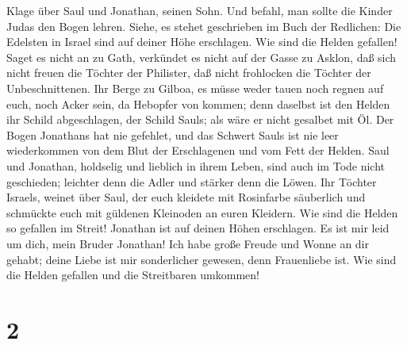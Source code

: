Klage über Saul und Jonathan, seinen Sohn.  Und befahl, man
sollte die Kinder Judas den Bogen lehren. Siehe, es stehet geschrieben
im Buch der Redlichen:  Die Edelsten in Israel sind auf
deiner Höhe erschlagen. Wie sind die Helden gefallen! 
Saget es nicht an zu Gath, verkündet es nicht auf der Gasse zu Asklon,
daß sich nicht freuen die Töchter der Philister, daß nicht frohlocken
die Töchter der Unbeschnittenen.  Ihr Berge zu Gilboa, es
müsse weder tauen noch regnen auf euch, noch Acker sein, da Hebopfer von
kommen; denn daselbst ist den Helden ihr Schild abgeschlagen, der Schild
Sauls; als wäre er nicht gesalbet mit Öl.  Der Bogen
Jonathans hat nie gefehlet, und das Schwert Sauls ist nie leer
wiederkommen von dem Blut der Erschlagenen und vom Fett der Helden.
 Saul und Jonathan, holdselig und lieblich in ihrem Leben,
sind auch im Tode nicht geschieden; leichter denn die Adler und stärker
denn die Löwen.  Ihr Töchter Israels, weinet über Saul, der
euch kleidete mit Rosinfarbe säuberlich und schmückte euch mit güldenen
Kleinoden an euren Kleidern.  Wie sind die Helden so
gefallen im Streit! Jonathan ist auf deinen Höhen erschlagen.
 Es ist mir leid um dich, mein Bruder Jonathan! Ich habe
große Freude und Wonne an dir gehabt; deine Liebe ist mir sonderlicher
gewesen, denn Frauenliebe ist.  Wie sind die Helden
gefallen und die Streitbaren umkommen!

\hypertarget{section-1}{%
\section{2}\label{section-1}}

